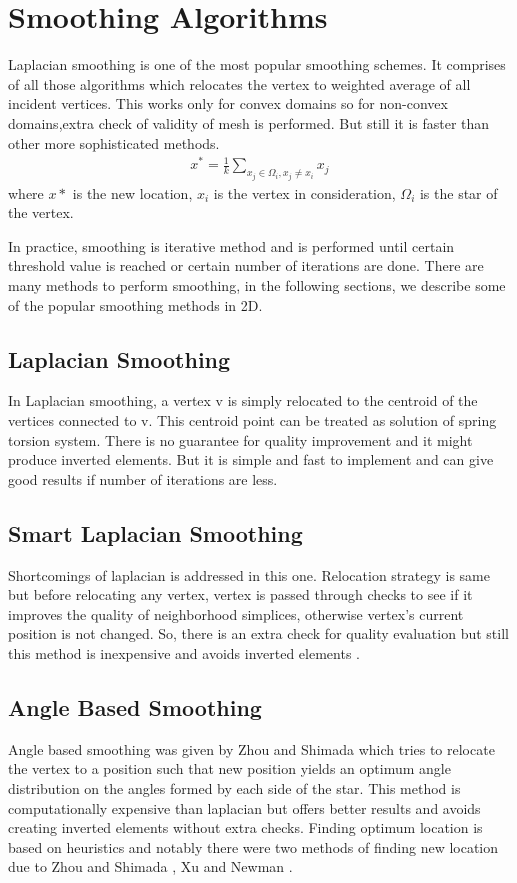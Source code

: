 \section{Smoothing Algorithms}
Laplacian smoothing is one of the most popular smoothing schemes. It comprises of all those algorithms \cite{dafield} which relocates the vertex to weighted average of all incident vertices. This works only for convex domains so for non-convex domains,extra check of validity of mesh is performed. But still it is faster than other more sophisticated methods. 
\begin{eqnarray}
x^*= \frac{1}{k} \sum_{x_j \in \Omega_i, x_j \neq x_i} x_j
\end{eqnarray}
where $x*$ is the new location, $x_i$ is the vertex in consideration, $\Omega_i$ is the star of the vertex.

In practice, smoothing is iterative method and is performed until certain threshold value is reached or certain number of iterations are done. There are many methods to perform smoothing, in the following sections, we describe some of the popular smoothing methods in 2D. 

\subsection{Laplacian Smoothing}
In Laplacian smoothing, a vertex v is simply relocated to the centroid of the vertices connected to v. This centroid point can be treated as solution of spring torsion system. There is no guarantee for quality improvement and it might produce inverted elements. But it is simple and fast to implement and can give good results if number of iterations are less.

\subsection{Smart Laplacian Smoothing}
Shortcomings of laplacian is addressed in this one. Relocation strategy is same but before relocating any vertex, vertex is passed through checks to see if it improves the quality of neighborhood simplices, otherwise vertex's current position is not changed. So, there is an extra check for quality evaluation but still this method is inexpensive and avoids inverted elements \cite{freitag}.

\subsection{Angle Based Smoothing}
Angle based smoothing was given by Zhou and Shimada \cite{zhou&shimada} which tries to relocate the vertex to a position such that new position yields an optimum angle distribution on the angles formed by each side of the star.
This method is computationally expensive than laplacian but offers better results and avoids creating inverted elements without extra checks. Finding optimum location is based on heuristics and notably there were two methods of finding new location due to Zhou and Shimada \cite{zhou&shimada}, Xu and Newman \cite{xu&newman}.

